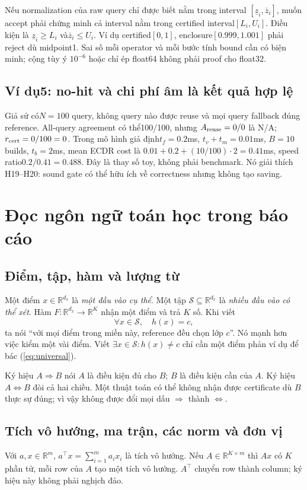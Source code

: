 \documentclass[11pt,a4paper]{article}
\newcommand{\R}{\mathbb R}
\newcommand{\Sset}{\mathcal S}
\theoremstyle{definition}
\begin{document}
Nếu normalization của raw query chỉ được biết nằm trong interval
$[\underline z_i,\overline z_i]$, muốn accept phải chứng minh cả interval
nằm trong certified interval$[L_i,U_i]$. Điều kiện là
$\underline z_i\ge L_i$ và$\overline z_i\le U_i$.
Ví dụ certified$[0,1]$, enclosure$[0.999,1.001]$ phải reject dù midpoint1.
Sai số mỗi operator và mỗi bước tính bound cần có biện minh; cộng tùy ý
$10^{-6}$ hoặc chỉ ép float64 không phải proof cho float32.

\subsection*{Ví dụ5: no-hit và chi phí âm là kết quả hợp lệ}
Giả sử có$N=100$ query, không query nào được reuse và mọi query fallback
đúng reference. All-query agreement có thể100/100, nhưng
$A_{\rm reuse}=0/0$ là N/A; $r_{\rm cert}=0/100=0$.
Trong mô hình giả định$t_f=0.2$ms, $t_v+t_m=0.01$ms,
$B=10$ builds, $t_b=2$ms, mean ECDR cost là
$0.01+0.2+(10/100)\cdot2=0.41$ms, speed ratio$0.2/0.41=0.488$.
Đây là thay số toy, không phải benchmark. Nó giải thích H19--H20:
sound gate có thể hữu ích về correctness nhưng không tạo saving.

\section{Đọc ngôn ngữ toán học trong báo cáo}
\subsection{Điểm, tập, hàm và lượng từ}
Một điểm $x\in\R^{d_x}$ là \emph{một đầu vào cụ thể}. Một tập
$\Sset\subseteq\R^{d_x}$ là \emph{nhiều đầu vào có thể xét}. Hàm
$F:\R^{d_x}\to\R^K$ nhận một điểm và trả $K$ số. Khi viết
\begin{equation}
\forall x\in\Sset,\quad h(x)=c,
\label{eq:universal}
\end{equation}
ta nói ``với mọi điểm trong miền này, reference đều chọn lớp $c$''. Nó
mạnh hơn việc kiểm một vài điểm. Viết $\exists x\in\Sset:h(x)\ne c$ chỉ cần
một điểm phản ví dụ để bác (\ref{eq:universal}).

Ký hiệu $A\Rightarrow B$ nói $A$ là điều kiện đủ cho $B$; $B$ là điều kiện
cần của $A$. Ký hiệu $A\Leftrightarrow B$ đòi cả hai chiều. Một thuật toán
có thể không nhận được certificate dù $B$ thực sự đúng; vì vậy không được
đổi mọi dấu $\Rightarrow$ thành $\Leftrightarrow$.

\subsection{Tích vô hướng, ma trận, các norm và đơn vị}
Với $a,x\in\R^m$, $a^\top x=\sum_{i=1}^m a_ix_i$ là tích vô hướng.
Nếu $A\in\R^{K\times m}$ thì $Ax$ có $K$ phần tử, mỗi row của $A$ tạo một
tích vô hướng. $A^\top$ chuyển row thành column; ký hiệu này không phải
nghịch đảo.
\end{document}
